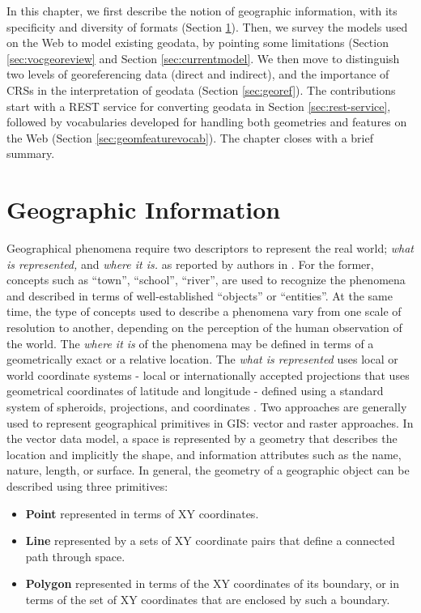 In this chapter, we first describe the notion of geographic information, with its specificity and diversity of formats (Section \ref{sec:geointro}). Then, we survey the models used on the Web to model existing geodata, by pointing some limitations (Section \ref{sec:vocgeoreview} and Section \ref{sec:currentmodel}. We then move to distinguish two levels of georeferencing data (direct and indirect), and the importance of CRSs in the interpretation of geodata (Section \ref{sec:georef}). The contributions start with a REST service for converting geodata in Section \ref{sec:rest-service}, followed by vocabularies developed for handling both geometries and features on the Web (Section \ref{sec:geomfeaturevocab}). The chapter closes with a brief summary.



\section{Geographic Information}
\label{sec:geointro}

Geographical phenomena require two descriptors to represent the real world; \textit{what is represented,} and \textit{where it is.} as reported by authors in \cite{burrough98}. For the former, concepts such as ``town'', ``school'', ``river'', are used to recognize the phenomena and described in terms of well-established ``objects'' or ``entities''. At the same time, the type of concepts used to describe a phenomena vary from one scale of resolution to another, depending on the perception of the human observation of the world. The \textit{where it is} of the phenomena may be defined in terms of a geometrically exact or a relative location. The \textit{what is represented} uses local or world coordinate systems - local or internationally accepted projections that uses geometrical coordinates of latitude and longitude - defined using a standard system of spheroids, projections, and coordinates \cite{burrough98}. Two approaches are generally used to represent geographical primitives in GIS: vector and raster approaches. In the vector data model, a space is represented by a geometry that describes the location and implicitly the shape, and information attributes such as the name, nature, length, or surface. In general, the geometry of a geographic object can be described using three primitives:
\begin{itemize}
\item \textbf{Point} represented in terms of XY coordinates.
\item \textbf{Line} represented by a sets of XY coordinate pairs that define a connected path through space. 
\item \textbf{Polygon} represented in terms of the XY coordinates of its boundary, or in terms of the set of XY coordinates that are enclosed by such a boundary. 
\end{itemize}    


